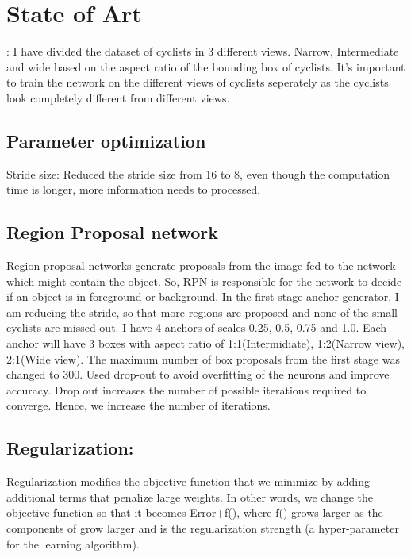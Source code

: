 \documentclass[11pt]{article}\usepackage[]{graphicx}\usepackage[]{color}
\begin{document}
\section{State of Art}:
I have divided the dataset of cyclists in 3 different views. Narrow, Intermediate and wide based on the
aspect ratio of the bounding box of cyclists. It’s important to train the network on the different views of
cyclists seperately as the cyclists look completely different from different views.

\subsection{Parameter optimization}
Stride size: Reduced the stride size from 16 to 8, even though the computation time is longer, more
information needs to processed.\\

\subsection{Region Proposal network}
Region proposal networks generate proposals from the image fed to the network which might contain
the object. So, RPN is responsible for the network to decide if an object is in foreground or background.
In the first stage anchor generator, I am reducing the stride, so that more regions are proposed and none of
the small cyclists are missed out.
I have 4 anchors of scales 0.25, 0.5, 0.75 and 1.0. Each anchor will have 3 boxes with aspect ratio of
1:1(Intermidiate), 1:2(Narrow view), 2:1(Wide view).
The maximum number of box proposals from the first stage was changed to 300. Used drop-out to
avoid overfitting of the neurons and improve accuracy. Drop out increases the number of possible iterations
required to converge. Hence, we increase the number of iterations.\\

\subsection{Regularization:}
Regularization modifies the objective function that we minimize by adding additional terms that penalize
large weights. In other words, we change the objective function so that it becomes Error+f(), where f()
grows larger as the components of grow larger and is the regularization strength (a hyper-parameter for
the learning algorithm).\\
\end{document}
